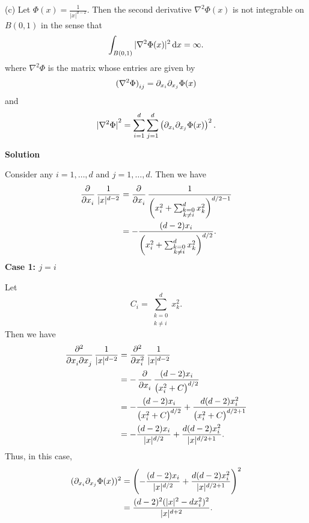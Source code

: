 \documentclass{article}
\begin{document}
(c) Let $\Phi(x) = \frac{1}{|x|^{d-2}}$. Then the second derivative
$\nabla^2 \Phi(x)$ is not integrable on $B(0, 1)$ in the sense that
%
\begin{equation*}
    \int_{B(0, 1)} |\nabla^2 \Phi(x)|^2 \dif x = \infty.
\end{equation*}
%
where $\nabla^2 \Phi$ is the matrix whose entries are given by
%
\begin{equation*}
    \del[0]{\nabla^2 \Phi}_{ij} = \partial_{x_i} \partial_{x_j} \Phi(x)
\end{equation*}
%
and
%
\begin{equation*}
    \envert[0]{\nabla^2 \Phi}^2
        = \sum_{i=1}^d \sum_{j=1}^d \del{\partial_{x_i} \partial_{x_j} \Phi(x)}^2
    .
\end{equation*}

\textbf{Solution}

Consider any $i = 1, \ldots, d$ and $j = 1, \ldots, d$. Then we have
%
\begin{align*}
    \dpd{}{x_i} \frac{1}{|x|^{d - 2}}
        &= \dpd{}{x_i} \frac{1}{\del{x_i^2 + \sum_{\substack{k = 0 \\ k \neq i}}^d x_k^2}^{d/2 - 1}} \\
        &= - \frac{(d - 2) x_i}{\del{x_i^2 + \sum_{\substack{k = 0 \\ k \neq i}}^d x_k^2}^{d/2}}
    .
\end{align*}
%
\textbf{Case 1: $j = i$}

Let
%
\begin{equation*}
    C_i = \sum_{\substack{k = 0 \\ k \neq i}}^d x_k^2
    .
\end{equation*}
%
Then we have
%
\begin{align*}
    \dmd{}{2}{x_i}{}{x_j}{} \frac{1}{|x|^{d - 2}}
        &= \dpd[2]{}{x_i} \frac{1}{|x|^{d - 2}} \\
        &= - \dpd{}{x_i} \frac{(d - 2) x_i}{\del{x_i^2 + C}^{d/2}} \\
        &= - \frac{(d - 2) x_i}{\del{x_i^2 + C}^{d/2}}
            + \frac{d (d - 2) x_i^2}{\del{x_i^2+ C}^{d/2 + 1}} \\
        &= - \frac{(d - 2) x_i}{|x|^{d/2}}
            + \frac{d (d - 2) x_i^2}{|x|^{d/2 + 1}}
    .
\end{align*}
%
Thus, in this case,
%
\begin{align*}
    (\partial_{x_i} \partial_{x_j} \Phi(x))^2
        &= \del{- \frac{(d - 2) x_i}{|x|^{d/2}}
            + \frac{d (d - 2) x_i^2}{|x|^{d/2 + 1}}}^2 \\
        &= \frac{(d - 2)^2 (|x|^2 - d x_i^2)^2}{|x|^{d + 2}}
        .
\end{align*}
%
\end{document}
